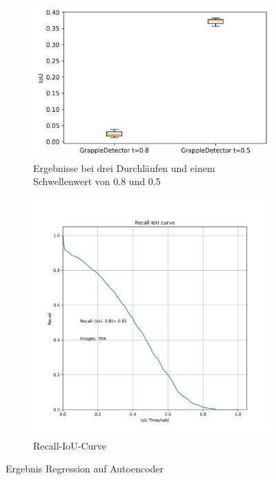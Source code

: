      \begin{figure}[h]
     \centering
     \begin{subfigure}[c]{0.49\textwidth}			
     	\includegraphics[width=1\textwidth,center]{bilder/Hauptteil/Autoencoder_Grappel_Detection/IoU_AE_Grapple.png}
     	\caption{Ergebnisse bei drei Durchläufen und einem Schwellenwert von 0.8 und 0.5}
     	\label{img:BoxPlot_RegressionAufAutoencoder0805}	
     \end{subfigure}
     	\begin{subfigure}[c]{0.49\textwidth}			
     		\includegraphics[width=1\textwidth, center]{bilder/Hauptteil/Autoencoder_Grappel_Detection/IoU.png}
    		\caption{Recall-IoU-Curve}
    		\label{img:RecalllIoUt_RegressionAufAutoencoder}	
    	\end{subfigure}
    	\caption{Ergebnis Regression auf Autoencoder}
         \label{img:ErgebnissRegressionAufAE}
    \end{figure}


